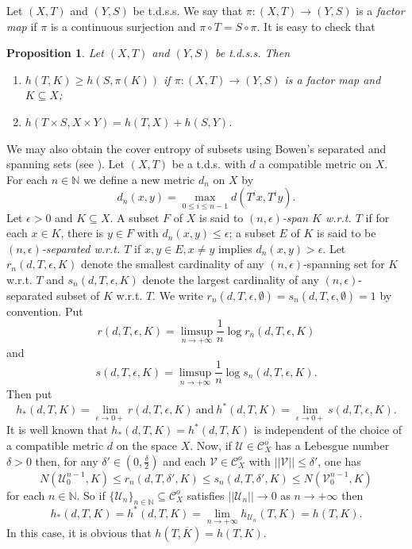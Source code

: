 \documentclass[12pt]{amsart}
\newtheorem{prop}[thm]{Proposition}
\theoremstyle{definition} \theoremstyle{question}
\numberwithin{equation}{section}
\begin{document}
Let $(X, T)$ and $(Y, S)$ be  t.d.s.s. We say that $\pi: (X,
T)\rightarrow (Y, S)$ is a {\it factor map} if $\pi$ is a continuous
surjection and $\pi\circ T= S\circ \pi$. It is easy to check that

\begin{prop} \label{090319}
Let $(X, T)$ and $(Y, S)$ be t.d.s.s. Then
\begin{enumerate}

\item $h (T, K)\ge h (S, \pi (K))$ if
$\pi: (X, T)\rightarrow (Y, S)$ is a factor map and $K\subseteq X$;

\item $h (T\times S, X\times Y)= h (T, X)+ h (S, Y)$.
\end{enumerate}
\end{prop}

We may also obtain the cover entropy of
subsets using Bowen's separated and spanning sets (see
\cite[P$_{168-174}$]{Wa}). Let $(X, T)$ be a t.d.s. with $d$ a compatible
metric on $X$. For each $n\in \mathbb{N}$ we define a new metric
$d_n$ on $X$ by
$$d_n (x, y)= \max_{0\le i\le n- 1}d (T^i x, T^i y).$$ Let
$\epsilon> 0$ and $K\subseteq X$. A subset $F$ of $X$ is said to
{\it $(n,\epsilon)$-span $K$ w.r.t. $T$} if for each $ x\in K$,
there is $y\in F$ with $d_n(x,y)\le\epsilon$; a subset $E$ of $K$ is
said to be {\it $(n,\epsilon)$-separated w.r.t. $T$} if $x,y\in E,
x\neq y$ implies $d_n(x,y)>\epsilon$. Let $r_n(d,T,\epsilon,K)$
denote the smallest cardinality of any $(n,\epsilon)$-spanning set
for $K$ w.r.t. $T$ and $s_n(d,T,\epsilon,K)$ denote the largest
cardinality of any $(n,\epsilon)$-separated subset of $K$ w.r.t.
$T$. We write $r_n(d,T,\epsilon,\emptyset)=s_n (d, T, \epsilon,
\emptyset)= 1$ by convention. Put
$$r (d, T, \epsilon, K)= \limsup_{n\rightarrow +\infty} \frac{1}{n}
\log r_n (d, T, \epsilon, K)$$ and
$$ s (d, T, \epsilon, K)= \limsup_{n\rightarrow +\infty} \frac{1}{n}
\log s_n (d, T, \epsilon, K).$$ Then put $$h_* (d, T, K)=
\lim_{\epsilon\rightarrow 0+} r (d, T, \epsilon, K)\ \text{and}\ h^*
(d, T, K)= \lim_{\epsilon\rightarrow 0+} s (d, T, \epsilon, K).$$ It
is  well known that $h_* (d, T, K)= h^* (d, T, K)$ is independent of
the choice of a compatible metric $d$ on the space $X$. Now, if
$\mathcal{U}\in \mathcal{C}^o_X$ has a Lebesgue number $\delta> 0$
then, for any $\delta'\in (0, \frac{\delta}{2})$ and each
$\mathcal{V}\in \mathcal{C}^o_X$ with $||\mathcal{V}||\le \delta'$,
one has
$$N(\mathcal{U}_0^{n- 1}, K)\le r_n (d, T, \delta', K)\le s_n (d, T,
\delta', K)\le N(\mathcal{V}_0^{n- 1}, K)$$ for each $n\in
\mathbb{N}$. So if $\{\mathcal{U}_n\}_{n\in \mathbb{N}}\subseteq
\mathcal{C}^o_X$ satisfies $||\mathcal{U}_n||\rightarrow 0$ as
$n\rightarrow +\infty$ then
\begin{equation*}
h_* (d, T, K)=h^* (d, T, K)=\lim_{n\rightarrow +\infty}
h_{\mathcal{U}_n} (T, K)= h (T, K).
\end{equation*}
In this case, it is obvious that $h (T, \overline{K})= h (T, K)$.
\end{document}
